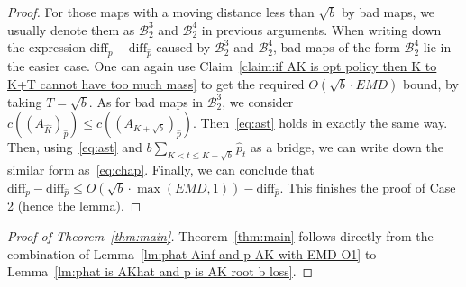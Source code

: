 \begin{proof}
    For those maps with a moving distance less than $\sqrt{b}$ by bad maps, we usually denote them as $\mathcal{B}^3_2$ and $\mathcal{B}^4_2$ in previous arguments. When writing down the expression $\text{diff}_p - \text{diff}_{\hat{p}}$ caused by $\mathcal{B}^3_2$ and $\mathcal{B}^4_2$, bad maps of the form $\mathcal{B}^4_2$ lie in the easier case. One can again use Claim~\ref{claim:if AK is opt policy then K to K+T cannot have too much mass} to get the required $O(\sqrt{b} \cdot EMD)$ bound, by taking $T=\sqrt{b}$. As for bad maps in $\mathcal{B}^3_2$, we consider $c((A_{\hat{K}})_{\hat{p}}) \leq c((A_{K+\sqrt{b}})_{\hat{p}})$. Then~\eqref{eq:ast} holds in exactly the same way. Then, using~\eqref{eq:ast} and $b\sum_{K<t \leq K+\sqrt{b}} \hat{p}_t$ as a bridge, we can write down the similar form as~\eqref{eq:chap}. Finally, we can conclude that $\text{diff}_p - \text{diff}_{\hat{p}} \leq O(\sqrt{b} \cdot \max(EMD,1)) -\text{diff}_{\hat{p}}$. This finishes the proof of Case 2 (hence the lemma).
\end{proof}


\begin{proof}[Proof of Theorem~\ref{thm:main}]
  Theorem~\ref{thm:main} follows directly from the combination of Lemma~\ref{lm:phat Ainf and p AK with EMD O1} to Lemma~\ref{lm:phat is AKhat and p is AK root b loss}.
\end{proof}
